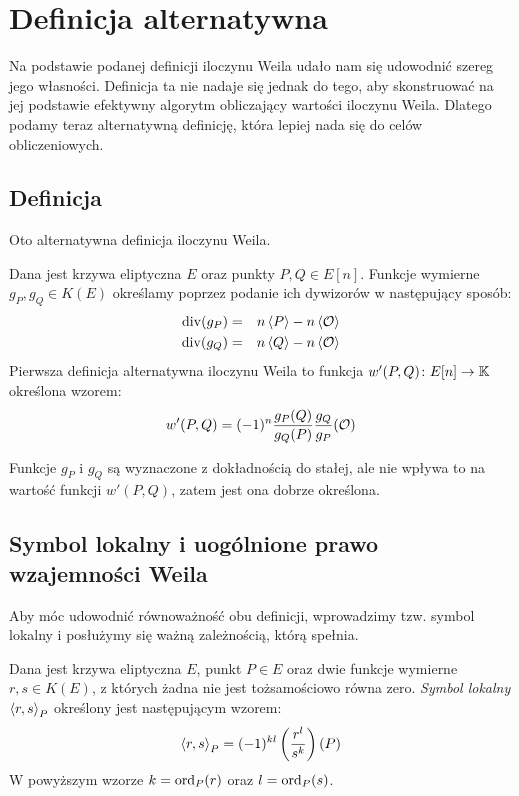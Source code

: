 \section{Definicja alternatywna}

Na podstawie podanej definicji iloczynu Weila
udało nam się udowodnić szereg jego własności.
Definicja ta nie nadaje się jednak do tego,
aby skonstruować na jej podstawie
efektywny algorytm obliczający wartości iloczynu Weila.
Dlatego podamy teraz alternatywną definicję,
która lepiej nada się do celów obliczeniowych.

\subsection*{Definicja}

Oto alternatywna definicja iloczynu Weila.

\begin{definition}
Dana jest krzywa eliptyczna $E$ oraz punkty $P, Q \in E[n]$.
Funkcje wymierne $g_P, g_Q \in K(E)$
określamy poprzez podanie ich dywizorów
w następujący sposób:
\begin{eqnarray*}
\operatorname{div}(g_P) & = & n\left\langle P\right\rangle - n\left\langle\mathcal{O}\right\rangle \\
\operatorname{div}(g_Q) & = & n\left\langle Q\right\rangle - n\left\langle\mathcal{O}\right\rangle
\end{eqnarray*}
Pierwsza definicja alternatywna iloczynu Weila
to funkcja $w'(P, Q)\colon E[n] \to \mathbb{K}$
określona wzorem:
\begin{equation}
w'(P, Q) = (-1)^n\frac{g_P(Q)}{g_Q(P)}\frac{g_Q}{g_P}(\mathcal{O})
\end{equation}
\end{definition}

\begin{remark}
Funkcje $g_P$ i $g_Q$ są wyznaczone z dokładnością do stałej,
ale nie wpływa to na wartość funkcji $w'(P, Q)$,
zatem jest ona dobrze określona.
\end{remark}

\subsection*{Symbol lokalny i uogólnione prawo wzajemności Weila}

Aby móc udowodnić równoważność obu definicji,
wprowadzimy tzw. symbol lokalny
i posłużymy się ważną zależnością, którą spełnia.

\begin{definition}
Dana jest krzywa eliptyczna $E$, punkt $P \in E$
oraz dwie funkcje wymierne $r, s \in K(E)$,
z których żadna nie jest tożsamościowo równa zero.
\emph{Symbol lokalny $\left\langle r , s \right\rangle_{P}$}
określony jest następującym wzorem:
\begin{equation}
\left\langle r , s \right\rangle_{P} = (-1)^{kl}\left(\frac{r^l}{s^k}\right)(P)
\end{equation}
W powyższym wzorze $k = \operatorname{ord}_P(r)$ oraz $l = \operatorname{ord}_P(s)$.
\end{definition}


